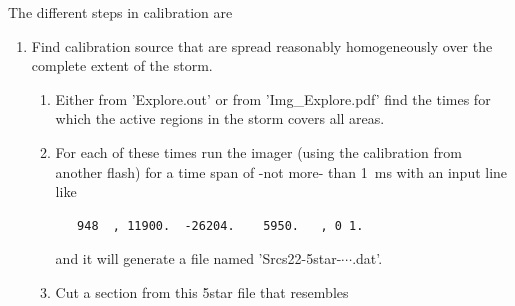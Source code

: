 The different steps in calibration are
\begin{enumerate}
\item Find calibration source that are spread reasonably homogeneously over the complete extent of the storm.
\begin{enumerate}
\item Either from 'Explore.out' or from 'Img\_Explore.pdf' find the times for which the active regions in the storm covers all areas.
\item For each of these times run the imager (using the calibration from another flash) for a time span of -not more- than 1~ms with an input line like
{
\tiny \begin{verbatim}
   948  , 11900.  -26204.    5950.   , 0 1.
\end{verbatim}
}
and it will generate a file named 'Srcs22-5star-$\cdots$.dat'.
\item Cut a section from this 5star file that resembles


\end{enumerate}
\end{enumerate}
